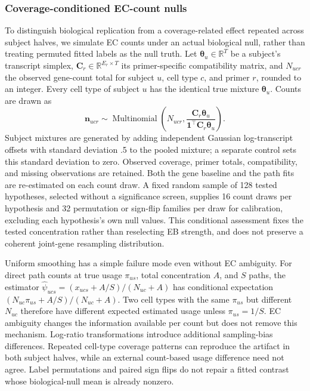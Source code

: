 \documentclass[11pt]{article}
\begin{document}
\subsubsection*{Coverage-conditioned EC-count nulls}

To distinguish biological replication from a coverage-related effect repeated across subject halves, we simulate EC counts under an actual biological null, rather than treating permuted fitted labels as the null truth. Let \(\boldsymbol\theta_u\in\mathbb R^T\) be a subject's transcript simplex, \(\mathbf C_r\in\mathbb R^{E_r\times T}\) its primer-specific compatibility matrix, and \(N_{ucr}\) the observed gene-count total for subject \(u\), cell type \(c\), and primer \(r\), rounded to an integer. Every cell type of subject \(u\) has the identical true mixture \(\boldsymbol\theta_u\). Counts are drawn as \begin{equation}\mathbf n_{ucr}\sim\operatorname{Multinomial}\left(N_{ucr},\frac{\mathbf C_r\boldsymbol\theta_u}{\mathbf1^\top\mathbf C_r\boldsymbol\theta_u}\right).\end{equation} Subject mixtures are generated by adding independent Gaussian log-transcript offsets with standard deviation .5 to the pooled mixture; a separate control sets this standard deviation to zero. Observed coverage, primer totals, compatibility, and missing observations are retained. Both the gene baseline and the path fits are re-estimated on each count draw. A fixed random sample of 128 tested hypotheses, selected without a significance screen, supplies 16 count draws per hypothesis and 32 permutation or sign-flip families per draw for calibration, excluding each hypothesis's own null values. This conditional assessment fixes the tested concentration rather than reselecting EB strength, and does not preserve a coherent joint-gene resampling distribution.

Uniform smoothing has a simple failure mode even without EC ambiguity. For direct path counts at true usage \(\pi_{us}\), total concentration \(A\), and \(S\) paths, the estimator \(\widehat\psi_{ucs}=(x_{ucs}+A/S)/(N_{uc}+A)\) has conditional expectation \((N_{uc}\pi_{us}+A/S)/(N_{uc}+A)\). Two cell types with the same \(\pi_{us}\) but different \(N_{uc}\) therefore have different expected estimated usage unless \(\pi_{us}=1/S\). EC ambiguity changes the information available per count but does not remove this mechanism. Log-ratio transformations introduce additional sampling-bias differences. Repeated cell-type coverage patterns can reproduce the artifact in both subject halves, while an external count-based usage difference need not agree. Label permutations and paired sign flips do not repair a fitted contrast whose biological-null mean is already nonzero.
\end{document}
